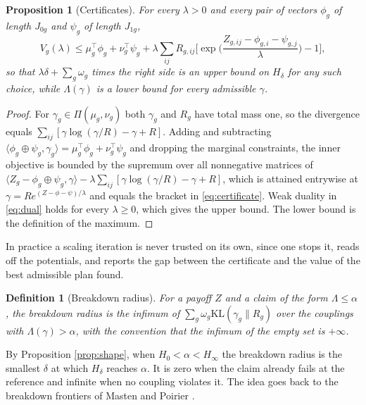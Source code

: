 \documentclass[11pt,a4paper]{article}
\theoremstyle{notesplain}
\newtheorem{proposition}[theorem]{Proposition}
\theoremstyle{notesupright}
\newtheorem{definition}[theorem]{Definition}
\numberwithin{equation}{section}
\newcommand{\KL}{\mathrm{KL}}
\begin{document}
\begin{proposition}[Certificates]
\label{prop:certificates}
For every $\lambda>0$ and every pair of vectors $\phi_g$ of length $J_{0g}$ and $\psi_g$ of length $J_{1g}$,
\begin{equation}
V_g(\lambda)\le\mu_g^\top\phi_g+\nu_g^\top\psi_g+\lambda\sum_{ij}R_{g,ij}\Big[\exp\Big(\frac{Z_{g,ij}-\phi_{g,i}-\psi_{g,j}}{\lambda}\Big)-1\Big],
\label{eq:certificate}
\end{equation}
so that $\lambda\delta+\sum_g\omega_g$ times the right side is an upper bound on $H_\delta$ for any such choice, while $\Lambda(\gamma)$ is a lower bound for every admissible $\gamma$.
\end{proposition}

\begin{proof}
For $\gamma_g\in\Pi(\mu_g,\nu_g)$ both $\gamma_g$ and $R_g$ have total mass one, so the divergence equals $\sum_{ij}[\gamma\log(\gamma/R)-\gamma+R]$. Adding and subtracting $\langle\phi_g\oplus\psi_g,\gamma_g\rangle=\mu_g^\top\phi_g+\nu_g^\top\psi_g$ and dropping the marginal constraints, the inner objective is bounded by the supremum over all nonnegative matrices of $\langle Z_g-\phi_g\oplus\psi_g,\gamma\rangle-\lambda\sum_{ij}[\gamma\log(\gamma/R)-\gamma+R]$, which is attained entrywise at $\gamma=Re^{(Z-\phi-\psi)/\lambda}$ and equals the bracket in \eqref{eq:certificate}. Weak duality in \eqref{eq:dual} holds for every $\lambda\ge0$, which gives the upper bound. The lower bound is the definition of the maximum.
\end{proof}

In practice a scaling iteration is never trusted on its own, since one stops it, reads off the potentials, and reports the gap between the certificate and the value of the best admissible plan found.

\begin{definition}[Breakdown radius]
\label{def:breakdown}
For a payoff $Z$ and a claim of the form $\Lambda\le\alpha$, the breakdown radius is the infimum of $\sum_g\omega_g\KL(\gamma_g\|R_g)$ over the couplings with $\Lambda(\gamma)>\alpha$, with the convention that the infimum of the empty set is $+\infty$.
\end{definition}

By Proposition \ref{prop:shape}, when $H_0<\alpha<H_\infty$ the breakdown radius is the smallest $\delta$ at which $H_\delta$ reaches $\alpha$. It is zero when the claim already fails at the reference and infinite when no coupling violates it. The idea goes back to the breakdown frontiers of Masten and Poirier \cite{mastenpoirier}.
\end{document}
